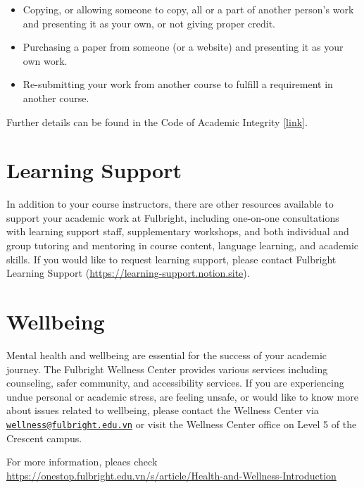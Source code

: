 \documentclass[
  openany]{book}
\begin{document}
\begin{itemize}
\item
  Copying, or allowing someone to copy, all or a part of another person's work and presenting it as your own, or not giving proper credit.
\item
  Purchasing a paper from someone (or a website) and presenting it as your own work.
\item
  Re-submitting your work from another course to fulfill a requirement in another course.
\end{itemize}

Further details can be found in the Code of Academic Integrity {[}\href{https://fulbright.edu.vn/articles/Code\%20of\%20Academic\%20Integrity/Code\%20of\%20Academic\%20Integrity_\%20Excom\%20Endorsed.pdf}{link}{]}.

\section*{Learning Support}\label{learning-support}

In addition to your course instructors, there are other resources available to support your
academic work at Fulbright, including one-on-one consultations with learning support staff,
supplementary workshops, and both individual and group tutoring and mentoring in course
content, language learning, and academic skills. If you would like to request learning support,
please contact Fulbright Learning Support (\url{https://learning-support.notion.site}).

\section*{Wellbeing}\label{wellbeing}

Mental health and wellbeing are essential for the success of your academic journey. The
Fulbright Wellness Center provides various services including counseling, safer community,
and accessibility services. If you are experiencing undue personal or academic stress, are
feeling unsafe, or would like to know more about issues related to wellbeing, please contact
the Wellness Center via \href{mailto:wellness@fulbright.edu.vn}{\nolinkurl{wellness@fulbright.edu.vn}} or visit the Wellness Center office on
Level 5 of the Crescent campus.

For more information, pleaes check
\url{https://onestop.fulbright.edu.vn/s/article/Health-and-Wellness-Introduction}
\end{document}
